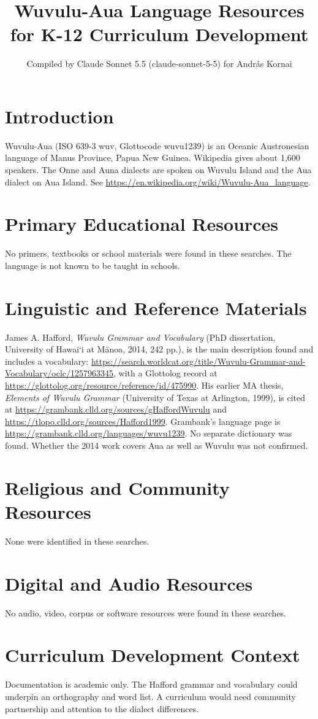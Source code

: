 \documentclass[12pt]{article}
\title{Wuvulu-Aua Language Resources for K-12 Curriculum Development}
\author{Compiled by Claude Sonnet 5.5 (claude-sonnet-5-5) for Andr\'as Kornai}
\date{}
\begin{document}
\maketitle

\section{Introduction}
Wuvulu-Aua (ISO 639-3 wuv, Glottocode wuvu1239) is an Oceanic Austronesian language of Manus Province, Papua New Guinea. Wikipedia gives about 1,600 speakers. The Onne and Auna dialects are spoken on Wuvulu Island and the Aua dialect on Aua Island. See \url{https://en.wikipedia.org/wiki/Wuvulu-Aua_language}.

\section{Primary Educational Resources}
No primers, textbooks or school materials were found in these searches. The language is not known to be taught in schools.

\section{Linguistic and Reference Materials}
James A. Hafford, \emph{Wuvulu Grammar and Vocabulary} (PhD dissertation, University of Hawai\textquoteleft i at M\=anoa, 2014, 242 pp.), is the main description found and includes a vocabulary: \url{https://search.worldcat.org/title/Wuvulu-Grammar-and-Vocabulary/oclc/1257963345}, with a Glottolog record at \url{https://glottolog.org/resource/reference/id/475990}. His earlier MA thesis, \emph{Elements of Wuvulu Grammar} (University of Texas at Arlington, 1999), is cited at \url{https://grambank.clld.org/sources/gHaffordWuvulu} and \url{https://tlopo.clld.org/sources/Hafford1999}. Grambank's language page is \url{https://grambank.clld.org/languages/wuvu1239}. No separate dictionary was found. Whether the 2014 work covers Aua as well as Wuvulu was not confirmed.

\section{Religious and Community Resources}
None were identified in these searches.

\section{Digital and Audio Resources}
No audio, video, corpus or software resources were found in these searches.

\section{Curriculum Development Context}
Documentation is academic only. The Hafford grammar and vocabulary could underpin an orthography and word list. A curriculum would need community partnership and attention to the dialect differences.
\end{document}
